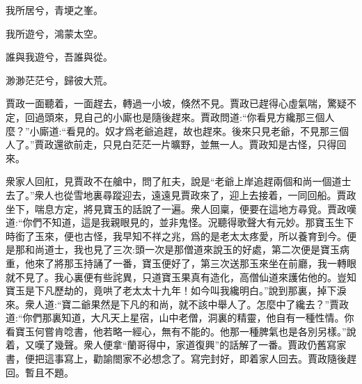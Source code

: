 \begin{poem}

    \begin{pl}
        我所居兮，青埂之峯。
    \end{pl}


    \begin{pl}
        我所遊兮，鴻蒙太空。
    \end{pl}


    \begin{pl}
        誰與我遊兮，吾誰與從。
    \end{pl}


    \begin{pl}
        渺渺茫茫兮，歸彼大荒。
    \end{pl}
\end{poem}


\begin{parag}
    賈政一面聽着，一面趕去，轉過一小坡，倏然不見。賈政已趕得心虛氣喘，驚疑不定，回過頭來，見自己的小廝也是隨後趕來。賈政問道:“你看見方纔那三個人麼？”小廝道:“看見的。奴才爲老爺追趕，故也趕來。後來只見老爺，不見那三個人了。”賈政還欲前走，只見白茫茫一片曠野，並無一人。賈政知是古怪，只得回來。
\end{parag}


\begin{parag}
    衆家人回舡，見賈政不在艙中，問了舡夫，說是“老爺上岸追趕兩個和尚一個道士去了。”衆人也從雪地裏尋蹤迎去，遠遠見賈政來了，迎上去接着，一同回船。賈政坐下，喘息方定，將見寶玉的話說了一遍。衆人回稟，便要在這地方尋覓。賈政嘆道:“你們不知道，這是我親眼見的，並非鬼怪。況聽得歌聲大有元妙。那寶玉生下時銜了玉來，便也古怪，我早知不祥之兆，爲的是老太太疼愛，所以養育到今。便是那和尚道士，我也見了三次:頭一次是那僧道來說玉的好處，第二次便是寶玉病重，他來了將那玉持誦了一番，寶玉便好了，第三次送那玉來坐在前廳，我一轉眼就不見了。我心裏便有些詫異，只道寶玉果真有造化，高僧仙道來護佑他的。豈知寶玉是下凡歷劫的，竟哄了老太太十九年！如今叫我纔明白。”說到那裏，掉下淚來。衆人道:“寶二爺果然是下凡的和尚，就不該中舉人了。怎麼中了纔去？”賈政道:“你們那裏知道，大凡天上星宿，山中老僧，洞裏的精靈，他自有一種性情。你看寶玉何嘗肯唸書，他若略一經心，無有不能的。他那一種脾氣也是各別另樣。”說着，又嘆了幾聲。衆人便拿“蘭哥得中，家道復興”的話解了一番。賈政仍舊寫家書，便把這事寫上，勸諭閤家不必想念了。寫完封好，即着家人回去。賈政隨後趕回。暫且不題。
\end{parag}


